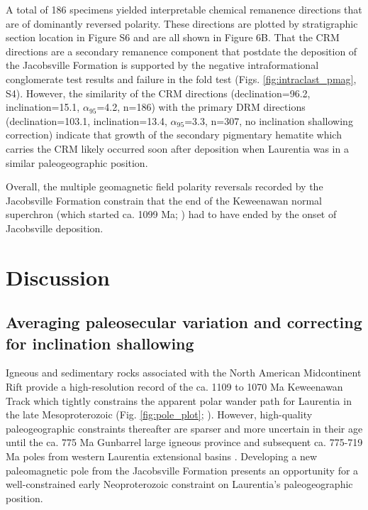 \documentclass[draft]{agujournal2019}
\begin{document}
A total of 186 specimens yielded interpretable chemical remanence directions that are of dominantly reversed polarity. These directions are plotted by stratigraphic section location in Figure S6 and are all shown in Figure 6B. That the CRM directions are a secondary remanence component that postdate the deposition of the Jacobsville Formation is supported by the negative intraformational conglomerate test results and failure in the fold test (Figs. \ref{fig:intraclast_pmag}, S4). However, the similarity of the CRM directions (declination=96.2\textdegree, inclination=15.1\textdegree, $\alpha_{95}$=4.2\textdegree, n=186) with the primary DRM directions (declination=103.1\textdegree, inclination=13.4\textdegree, $\alpha_{95}$=3.3\textdegree, n=307, no inclination shallowing correction) indicate that growth of the secondary pigmentary hematite which carries the CRM likely occurred soon after deposition when Laurentia was in a similar paleogeographic position. 

Overall, the multiple geomagnetic field polarity reversals recorded by the Jacobsville Formation constrain that the end of the Keweenawan normal superchron \cite{Driscoll2016b} (which started ca. 1099 Ma; ) had to have ended by the onset of Jacobsville deposition.
 
\section*{Discussion}
\subsection*{Averaging paleosecular variation and correcting for inclination shallowing}

Igneous and sedimentary rocks associated with the North American Midcontinent Rift provide a high-resolution record of the ca. 1109 to 1070 Ma Keweenawan Track which tightly constrains the apparent polar wander path for Laurentia in the late Mesoproterozoic (Fig. \ref{fig:pole_plot}; ). However, high-quality paleogeographic constraints thereafter are sparser and more uncertain in their age until the ca. 775 Ma Gunbarrel large igneous province \cite{Harlan2003a} and subsequent ca. 775-719 Ma poles from western Laurentia extensional basins \cite{Weil2006a, Eyster2019a}. Developing a new paleomagnetic pole from the Jacobsville Formation presents an opportunity for a well-constrained early Neoproterozoic constraint on Laurentia's paleogeographic position. 
\end{document}

